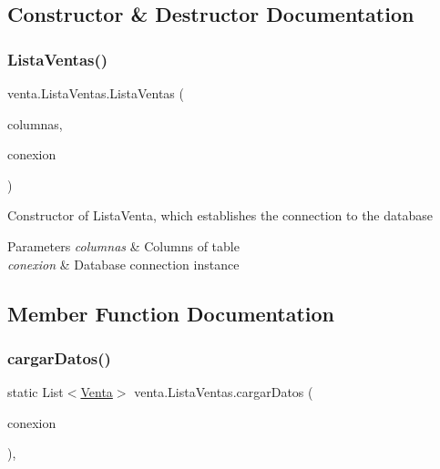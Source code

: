 \subsection{Constructor \& Destructor Documentation}
\mbox{\label{classventa_1_1_lista_ventas_a69da326fde1b9ceea242d38147016528}} 
\subsubsection{\texorpdfstring{Lista\+Ventas()}{ListaVentas()}}
{\footnotesize\ttfamily venta.\+Lista\+Ventas.\+Lista\+Ventas (\begin{DoxyParamCaption}\item[{\mbox{\hyperlink{classventa_1_1_modelo_columnas_tabla_venta}{Modelo\+Columnas\+Tabla\+Venta}}}]{columnas,  }\item[{\mbox{\hyperlink{classconexion_s_q_l_1_1_my_data_access}{My\+Data\+Access}}}]{conexion }\end{DoxyParamCaption})\hspace{0.3cm}{\ttfamily [inline]}}

Constructor of Lista\+Venta, which establishes the connection to the database 
\begin{DoxyParams}{Parameters}
{\em columnas} & Columns of table \\
\hline
{\em conexion} & Database connection instance \\
\hline
\end{DoxyParams}


\subsection{Member Function Documentation}
\mbox{\label{classventa_1_1_lista_ventas_a5addbb3cc5ae30ddd938cc5ae3021a48}} 
\subsubsection{\texorpdfstring{cargar\+Datos()}{cargarDatos()}}
{\footnotesize\ttfamily static List$<$\mbox{\hyperlink{classventa_1_1_venta}{Venta}}$>$ venta.\+Lista\+Ventas.\+cargar\+Datos (\begin{DoxyParamCaption}\item[{\mbox{\hyperlink{classconexion_s_q_l_1_1_my_data_access}{My\+Data\+Access}}}]{conexion }\end{DoxyParamCaption})\hspace{0.3cm}{\ttfamily [inline]}, {\ttfamily [static]}}

